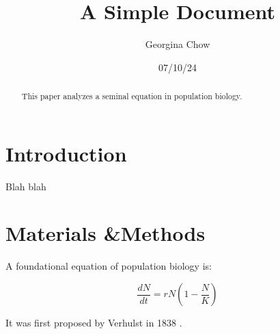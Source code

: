 \documentclass[12pt]{article}
\title{A Simple Document}
\author{Georgina Chow}
\date{07/10/24}
\begin{document}
    \maketitle 

    \begin{abstract}
        This paper analyzes a seminal equation in population biology. 
    \end{abstract}

    \section{Introduction}
        Blah blah 
    
    \section{Materials \&Methods}

        A foundational equation of population biology is: 
    
    \begin{equation}
        \frac{dN}{dt} = r N (1 - \frac{N}{K})
    \end{equation}
     
    It was first proposed by Verhulst in 1838 \cite{verhulst1838notice}.

    

    
\end{document}
